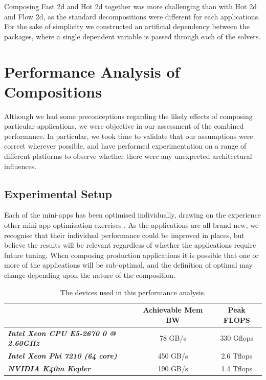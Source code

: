 \documentclass[runningheads,a4paper]{llncs}
\begin{document}
Composing Fast 2d and Hot 2d together was more challenging than with Hot 2d and Flow 2d, as the standard decompositions were different for each applications. For the sake of simplicity we constructed an artificial dependency between the packages, where a single dependent variable is passed through each of the solvers.

\section{Performance Analysis of Compositions}

Although we had some preconceptions regarding the likely effects of composing particular applications, we were objective in our assessment of the combined performance. In particular, we took time to validate that our assumptions were correct wherever possible, and have performed experimentation on a range of different platforms to observe whether there were any unexpected architectural influences.

\subsection{Experimental Setup}

Each of the mini-apps has been optimised individually, drawing on the experience other mini-app optimisation exercises \cite{Bird2013} \cite{Ivanov2015}. As the applications are all brand new, we recognise that their individual performance could be improved in places, but believe the results will be relevant regardless of whether the applications require future tuning. When composing production applications it is possible that one or more of the applications will be sub-optimal, and the definition of optimal may change depending upon the nature of the composition.

\begin{table}[h]
  \begin{center}
    \begin{tabular}{l|c|c}
      \hline
      \textbf{} & \textbf{Achievable Mem BW} & \textbf{Peak FLOPS}  \\
      \hline
      \textit{\textbf{Intel Xeon CPU E5-2670 0 @ 2.60GHz}} & 78 GB/s & 330 Gflops \\
      \textit{\textbf{Intel Xeon Phi 7210 (64 core)}} & 450 GB/s & 2.6 Tflops \\
      \textit{\textbf{NVIDIA K40m Kepler}} & 190 GB/s & 1.4 Tflops \\
    \end{tabular}
  \end{center}
  \caption{The devices used in this performance analysis.}
  \label{tab:hardware}
\end{table}
\end{document}
